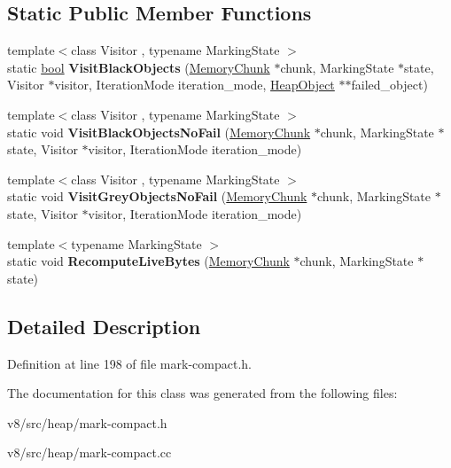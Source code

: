 \subsection*{Static Public Member Functions}
\begin{DoxyCompactItemize}
\item 
\mbox{\label{classv8_1_1internal_1_1LiveObjectVisitor_abc101092a0a15992b68a1367e264cee2}} 
{\footnotesize template$<$class Visitor , typename Marking\+State $>$ }\\static \mbox{\hyperlink{classbool}{bool}} {\bfseries Visit\+Black\+Objects} (\mbox{\hyperlink{classv8_1_1internal_1_1MemoryChunk}{Memory\+Chunk}} $\ast$chunk, Marking\+State $\ast$state, Visitor $\ast$visitor, Iteration\+Mode iteration\+\_\+mode, \mbox{\hyperlink{classv8_1_1internal_1_1HeapObject}{Heap\+Object}} $\ast$$\ast$failed\+\_\+object)
\item 
\mbox{\label{classv8_1_1internal_1_1LiveObjectVisitor_a3aaf3c51c4da48bd802f7638f12f3eab}} 
{\footnotesize template$<$class Visitor , typename Marking\+State $>$ }\\static void {\bfseries Visit\+Black\+Objects\+No\+Fail} (\mbox{\hyperlink{classv8_1_1internal_1_1MemoryChunk}{Memory\+Chunk}} $\ast$chunk, Marking\+State $\ast$state, Visitor $\ast$visitor, Iteration\+Mode iteration\+\_\+mode)
\item 
\mbox{\label{classv8_1_1internal_1_1LiveObjectVisitor_aa97e85b57c70291459df64371dee3914}} 
{\footnotesize template$<$class Visitor , typename Marking\+State $>$ }\\static void {\bfseries Visit\+Grey\+Objects\+No\+Fail} (\mbox{\hyperlink{classv8_1_1internal_1_1MemoryChunk}{Memory\+Chunk}} $\ast$chunk, Marking\+State $\ast$state, Visitor $\ast$visitor, Iteration\+Mode iteration\+\_\+mode)
\item 
\mbox{\label{classv8_1_1internal_1_1LiveObjectVisitor_a19075b50dd180af1c5e2ee5507293a4c}} 
{\footnotesize template$<$typename Marking\+State $>$ }\\static void {\bfseries Recompute\+Live\+Bytes} (\mbox{\hyperlink{classv8_1_1internal_1_1MemoryChunk}{Memory\+Chunk}} $\ast$chunk, Marking\+State $\ast$state)
\end{DoxyCompactItemize}


\subsection{Detailed Description}


Definition at line 198 of file mark-\/compact.\+h.



The documentation for this class was generated from the following files\+:\begin{DoxyCompactItemize}
\item 
v8/src/heap/mark-\/compact.\+h\item 
v8/src/heap/mark-\/compact.\+cc\end{DoxyCompactItemize}
